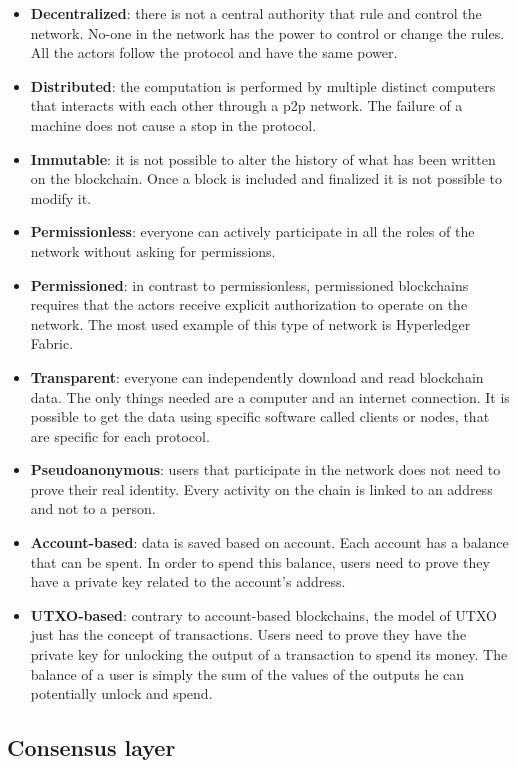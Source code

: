 \begin{itemize}
    \item \textbf{Decentralized}: there is not a central authority that rule and control the network. No-one in the network has the power to control or change the rules. All the actors follow the protocol and have the same power.
    \item \textbf{Distributed}: the computation is performed by multiple distinct computers that interacts with each other through a p2p network. The failure of a machine does not cause a stop in the protocol.
    \item \textbf{Immutable}: it is not possible to alter the history of what has been written on the blockchain. Once a block is included and finalized it is not possible to modify it.
    \item \textbf{Permissionless}: everyone can actively participate in all the roles of the network without asking for permissions.
    \item \textbf{Permissioned}: in contrast to permissionless, permissioned blockchains requires that the actors receive explicit authorization to operate on the network. The most used example of this type of network is Hyperledger Fabric.
    \item \textbf{Transparent}: everyone can independently download and read blockchain data. The only things needed are a computer and an internet connection. It is possible to get the data using specific software called clients or nodes, that are specific for each protocol.
    \item \textbf{Pseudoanonymous}: users that participate in the network does not need to prove their real identity. Every activity on the chain is linked to an address and not to a person. 
    \item \textbf{Account-based}: data is saved based on account. Each account has a balance that can be spent. In order to spend this balance, users need to prove they have a private key related to the account's address.
    \item \textbf{UTXO-based}: contrary to account-based blockchains, the model of UTXO just has the concept of transactions. Users need to prove they have the private key for unlocking the output of a transaction to spend its money. The balance of a user is simply the sum of the values of the outputs he can potentially unlock and spend.
\end{itemize}

\subsection{Consensus layer}

